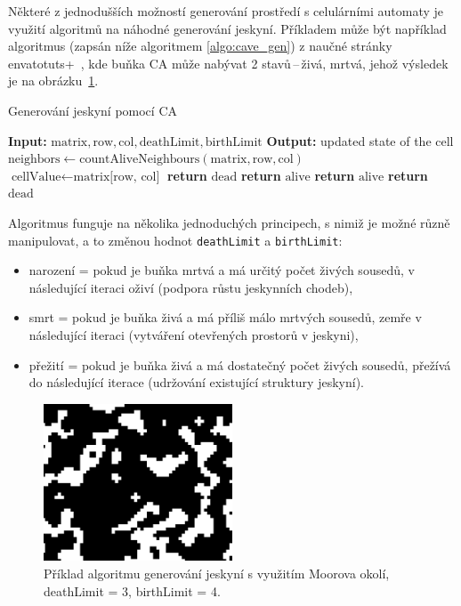 Některé z jednodušších možností generování prostředí s celulárními automaty je využití algoritmů na náhodné generování jeskyní. Příkladem může být například algoritmus (zapsán níže algoritmem \ref{algo:cave_gen}) z naučné stránky envatotuts+~\cite{CaveCA}, kde buňka CA může nabývat 2 stavů\,--\,živá, mrtvá, jehož výsledek je na obrázku~\ref{fig:cave}.
\begin{algorithm}
\caption{Generování jeskyní pomocí CA}\label{algo:cave_gen}
\begin{algorithmic}[1]
\State \textbf{Input:} $\text{matrix}, \text{row}, \text{col}, \text{deathLimit}, \text{birthLimit}$
\State \textbf{Output:} updated state of the cell
\State $\text{neighbors} \gets \text{countAliveNeighbours}(\text{matrix}, \text{row}, \text{col})$
\State $\text{cellValue} \gets \text{matrix[row, col]}$
      
        \State \textbf{return} $\text{dead}$
    \Else
        \State \textbf{return} $\text{alive}$
    \EndIf
\Else
      
        \State \textbf{return} $\text{alive}$
    \Else
        \State \textbf{return} $\text{dead}$
    \EndIf
\EndIf
\end{algorithmic}
\end{algorithm}
\newline
Algoritmus funguje na několika jednoduchých principech, s nimiž je možné různě manipulovat, a to změnou hodnot \verb|deathLimit| a \verb|birthLimit|:
\begin{itemize}
    \item narození = pokud je buňka mrtvá a má určitý počet živých sousedů, v následující iteraci oživí (podpora růstu jeskynních chodeb),
    \item smrt = pokud je buňka živá a má příliš málo mrtvých sousedů, zemře v následující iteraci (vytváření otevřených prostorů v jeskyni),
    \item přežití = pokud je buňka živá a má dostatečný počet živých sousedů, přežívá do následující iterace (udržování existující struktury jeskyní).
\end{itemize}

\begin{figure}[H]
    \centering
    \includegraphics[width=0.5\textwidth]{obrazky-figures/ch2/cave.png}
    \caption{Příklad algoritmu generování jeskyní s využitím Moorova okolí,	deathLimit = 3, birthLimit = 4.}
    \label{fig:cave}
\end{figure}

